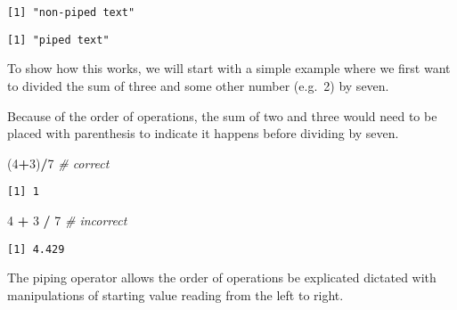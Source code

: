 \documentclass[12pt,]{article}
\newenvironment{Shaded}{\begin{snugshade}}{\end{snugshade}}
\newcommand{\KeywordTok}[1]{\textcolor[rgb]{0.13,0.29,0.53}{\textbf{#1}}}
\newcommand{\DecValTok}[1]{\textcolor[rgb]{0.00,0.00,0.81}{#1}}
\newcommand{\StringTok}[1]{\textcolor[rgb]{0.31,0.60,0.02}{#1}}
\newcommand{\CommentTok}[1]{\textcolor[rgb]{0.56,0.35,0.01}{\textit{#1}}}
\newcommand{\OperatorTok}[1]{\textcolor[rgb]{0.81,0.36,0.00}{\textbf{#1}}}
\newcommand{\NormalTok}[1]{#1}
\theoremstyle{definition}
\theoremstyle{definition}
\theoremstyle{definition}
\theoremstyle{remark}
\begin{document}
\begin{verbatim}
[1] "non-piped text"
\end{verbatim}

\begin{Shaded}
\end{Shaded}

\begin{verbatim}
[1] "piped text"
\end{verbatim}

To show how this works, we will start with a simple example where we
first want to divided the sum of three and some other number (e.g.~2) by
seven.

Because of the order of operations, the sum of two and three would need
to be placed with parenthesis to indicate it happens before dividing by
seven.

\begin{Shaded}
\begin{Highlighting}[]
\NormalTok{(}\DecValTok{4}\OperatorTok{+}\DecValTok{3}\NormalTok{)}\OperatorTok{/}\DecValTok{7} \CommentTok{# correct}
\end{Highlighting}
\end{Shaded}

\begin{verbatim}
[1] 1
\end{verbatim}

\begin{Shaded}
\begin{Highlighting}[]
\DecValTok{4} \OperatorTok{+}\StringTok{ }\DecValTok{3} \OperatorTok{/}\StringTok{ }\DecValTok{7} \CommentTok{# incorrect}
\end{Highlighting}
\end{Shaded}

\begin{verbatim}
[1] 4.429
\end{verbatim}

The piping operator allows the order of operations be explicated
dictated with manipulations of starting value reading from the left to
right.

\begin{Shaded}
\end{Shaded}
\end{document}
